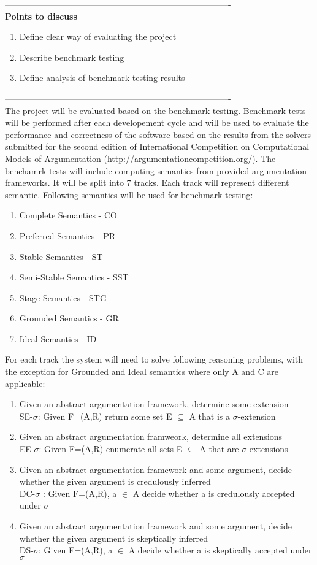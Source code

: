 
-------------------------------------------------------------------------------\\
\textbf{Points to discuss}
\begin{enumerate}
	\item{Define clear way of evaluating the project}
	\item{Describe benchmark testing}
	\item{Define analysis of benchmark testing results}
\end{enumerate}
-------------------------------------------------------------------------------\\

The project will be evaluated based on the benchmark testing. Benchmark tests will be performed after each developement cycle and will be used to evaluate the performance and correctness of the software based on the results from the solvers submitted for the second edition of International Competition on Computational Models of Argumentation (http://argumentationcompetition.org/). 
The benchamrk tests will include computing semantics from provided argumentation frameworks. It will be split into 7 tracks. Each track will represent different semantic. Following semantics will be used for benchmark testing:
\begin{enumerate}
	\item{Complete Semantics - CO}
	\item{Preferred Semantics - PR}
	\item{Stable Semantics - ST}
	\item{Semi-Stable Semantics - SST}
	\item{Stage Semantics - STG}
	\item{Grounded Semantics - GR}
	\item{Ideal Semantics - ID}
\end{enumerate}

For each track the system will need to solve following reasoning problems, with the exception for Grounded and Ideal semantics where only A and C are applicable:
\begin{enumerate}
	\item{Given an abstract argumentation framework, determine some extension\\SE-$\sigma$: Given F=(A,R) return some set E $\subseteq$ A that is a $\sigma$-extension}
	\item{Given an abstract argumentation framweork, determine all extensions\\EE-$\sigma$: Given F=(A,R) enumerate all sets E $\subseteq$ A that are $\sigma$-extensions}
	\item{Given an abstract argumentation framework and some argument, decide whether the given argument is credulously inferred\\DC-$\sigma$ : Given F=(A,R), a $\in$ A decide whether a is credulously accepted under $\sigma$}
	\item{Given an abstract argumentation framework and some argument, decide whether the given argument is skeptically inferred\\DS-$\sigma$: Given F=(A,R), a $\in$ A decide whether a is skeptically accepted under $\sigma$}
\end{enumerate}

